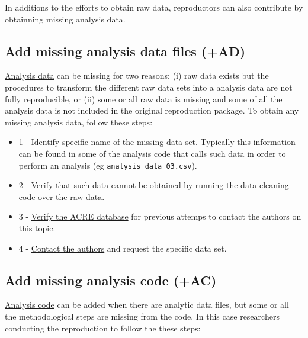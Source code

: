 \documentclass[]{book}
\providecommand{\tightlist}{%
  \setlength{\itemsep}{0pt}\setlength{\parskip}{0pt}}
\begin{document}
In additions to the efforts to obtain raw data, reproductors can also contribute by obtainning missing analysis data.

\hypertarget{add-missing-analysis-data-files-ad}{%
\subsection{Add missing analysis data files (+AD)}\label{add-missing-analysis-data-files-ad}}

\protect\hyperlink{describe-inputs}{Analysis data} can be missing for two reasons: (i) raw data exists but the procedures to transform the different raw data sets into a analysis data are not fully reproducible, or (ii) some or all raw data is missing and some of all the analysis data is not included in the original reproduction package. To obtain any missing analysis data, follow these steps:

\begin{itemize}
\tightlist
\item
  1 - Identify specific name of the missing data set. Typically this information can be found in some of the analysis code that calls such data in order to perform an analysis (eg \texttt{analysis\_data\_03.csv}).\\
\item
  2 - Verify that such data cannot be obtained by running the data cleaning code over the raw data.\\
\item
  3 - \href{ADD\%20LINK}{Verify the ACRE database} for previous attemps to contact the authors on this topic.\\
\item
  4 - \protect\hyperlink{tips-for-communication}{Contact the authors} and request the specific data set.
\end{itemize}

\hypertarget{add-missing-analysis-code-ac}{%
\subsection{Add missing analysis code (+AC)}\label{add-missing-analysis-code-ac}}

\protect\hyperlink{describe-inputs}{Analysis code} can be added when there are analytic data files, but some or all the methodological steps are missing from the code. In this case researchers conducting the reproduction to follow the these steps:
\end{document}
